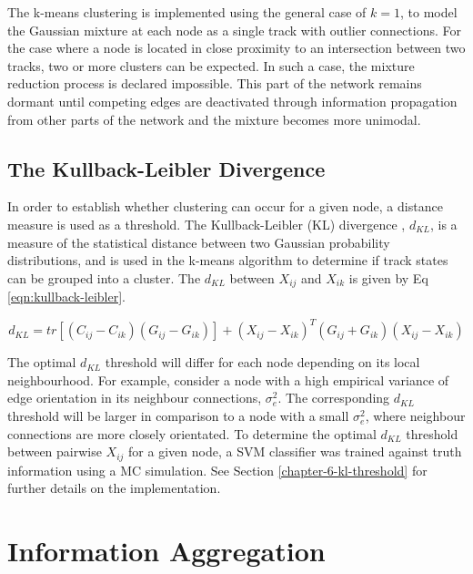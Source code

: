 The k-means clustering is implemented using the general case of $k=1$, to model the Gaussian mixture at each node as a single track with outlier connections. For the case where a node is located in close proximity to an intersection between two tracks, two or more clusters can be expected. In such a case, the mixture reduction process is declared impossible. This part of the network remains dormant until competing edges are deactivated through information propagation from other parts of the network and the mixture becomes more unimodal. 


\subsection{The Kullback-Leibler Divergence}
In order to establish whether clustering can occur for a given node, a distance measure is used as a threshold. The Kullback-Leibler (KL) divergence \cite{KL, FRUHWIRTH19971}, $d_{KL}$, is a measure of the statistical distance between two Gaussian probability distributions, and is used in the k-means algorithm to determine if track states can be grouped into a cluster. The $d_{KL}$ between $X_{ij}$ and $X_{ik}$ is given by Eq \eqref{eqn:kullback-leibler}.

\begin{equation}
    d_{KL} = tr[(C_{ij} - C_{ik})(G_{ij} - G_{ik})] + (X_{ij} - X_{ik})^{T}(G_{ij} + G_{ik})(X_{ij} - X_{ik})
    \label{eqn:kullback-leibler}
\end{equation}

The optimal $d_{KL}$ threshold will differ for each node depending on its local neighbourhood. For example, consider a node with a high empirical variance of edge orientation in its neighbour connections, $\sigma_{e}^{2}$. The corresponding $d_{KL}$ threshold will be larger in comparison to a node with a small $\sigma_{e}^{2}$, where neighbour connections are more closely orientated. To determine the optimal $d_{KL}$ threshold between pairwise $X_{ij}$ for a given node, a SVM classifier was trained against truth information using a MC simulation. See Section \ref{chapter-6-kl-threshold} for further details on the implementation.





\section{Information Aggregation}


